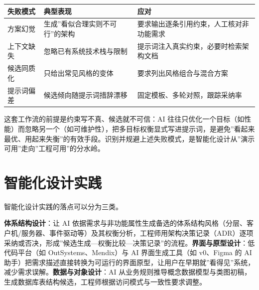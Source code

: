 \documentclass[
]{ctexbook}
\newcounter{none}
\begin{document}
{\def\LTcaptype{none} %
\begin{longtable}[]{@{}
  >{\raggedright\arraybackslash}p{}
  >{\raggedright\arraybackslash}p{}
  >{\raggedright\arraybackslash}p{}@{}}
\toprule\noalign{}
\begin{minipage}[b]{\linewidth}\raggedright
失败模式
\end{minipage} & \begin{minipage}[b]{\linewidth}\raggedright
典型表现
\end{minipage} & \begin{minipage}[b]{\linewidth}\raggedright
应对
\end{minipage} \\
\midrule\noalign{}
\endhead
\bottomrule\noalign{}
\endlastfoot
方案幻觉 & 生成''看似合理实则不可行''的架构 &
要求输出逐条引用约束，人工核对非功能需求 \\
上下文缺失 & 忽略已有系统技术栈与限制 &
提示词注入真实约束，必要时检索架构文档 \\
候选同质化 & 只给出常见风格的变体 & 要求列出风格组合与混合方案 \\
提示词偏差 & 候选倾向随提示词措辞漂移 &
固定模板、多轮对照，跟踪采纳率 \\
\end{longtable}
}

这套工作流的前提是约束写不真、候选就不可信：AI
往往只优化一个目标（如性能）而忽略另一个（如可维护性），把多目标权衡显式写进提示词，是避免''看起来最优、用起来失衡''的有效手段。识别并规避上述失败模式，是智能化设计从''演示可用''走向''工程可用''的分水岭。

\section{智能化设计实践}\label{ux667aux80fdux5316ux8bbeux8ba1ux5b9eux8df5}

智能化设计实践的落点可以分为三类。

\textbf{体系结构设计}：让 AI
依据需求与非功能属性生成备选的体系结构风格（分层、客户机/服务器、事件驱动等）及其权衡分析，工程师用架构决策记录（ADR）逐项采纳或否决，形成''候选生成---权衡比较---决策记录''的流程。\textbf{界面与原型设计}：低代码平台（如
OutSystems、Mendix）与 AI 界面生成工具（如 v0、Figma 的 AI
助手）把需求描述直接转换为可运行的界面原型，让用户在早期就''看得见''系统，减少需求误解。\textbf{数据与对象设计}：AI
从业务规则推导概念数据模型与类图初稿，生成数据库表结构候选，工程师根据访问模式与一致性要求调整。
\end{document}
